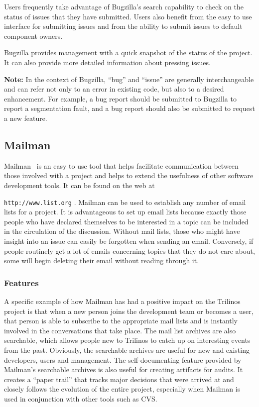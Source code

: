 \documentclass[12pt,relax]{article}
\newcommand{\InlineDirectory}[1]{
  {\hspace{0.01 in}} {\tt #1} {\hspace{0.01 in}}}
\begin{document}
Users frequently take advantage of Bugzilla's search capability to check on 
the status of issues that they have submitted.  Users also benefit from the 
easy to use interface for submitting issues and from the ability to submit 
issues to default component owners.  

Bugzilla provides management with a quick snapshot of the status of the 
project.  It can also provide more detailed information about pressing issues.

{\bf Note:} In the context of Bugzilla, ``bug'' and ``issue'' are generally 
interchangeable and can refer not only to an error in 
existing code, but also to a desired enhancement.  For example, a bug report 
should be submitted to Bugzilla to report a segmentation fault, and a bug 
report should also be submitted to request a new feature.

\subsection{Mailman}
\label{subsect:MailMan}
Mailman~\cite{Mailman} is an easy to use tool that helps facilitate 
communication between
those involved with a project and helps to extend the usefulness of other 
software development tools.  It can be found on the web at 
\InlineDirectory{http://www.list.org}.  Mailman can be used to establish any 
number of 
email lists for a project.  It is advantageous to set up email lists because exactly 
those people who have declared themselves to be interested in a 
topic can be included in the circulation of the discussion.  Without 
mail lists, those who might have insight into an issue can easily be forgotten 
when sending an email.  Conversely, if people routinely get a lot of emails 
concerning topics that they do not care about, some will begin deleting
their email without reading through it.  

\subsubsection{Features}

A specific example of how Mailman 
has had a positive impact on the Trilinos project is that when a new person
joins the development team or becomes a user, that person is able to 
subscribe to the appropriate mail lists and is instantly involved in the 
conversations that take place.  The mail list archives are also searchable, 
which allows people new to Trilinos to catch up on interesting events from the 
past.  Obviously, the searchable archives are useful for new and existing 
developers, users and management.  The self-documenting feature provided 
by Mailman's searchable archives is also useful for creating artifacts for 
audits.  It creates a ``paper trail'' that tracks major decisions that were 
arrived at and closely follows 
the evolution of the entire project, especially when Mailman is used in 
conjunction with other tools such as CVS.
\end{document}
